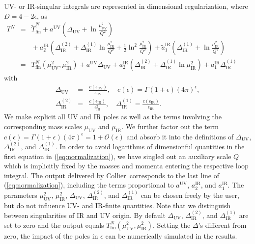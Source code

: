 \documentclass[preprint,sort&compress,12pt]{elsarticle}
\def\beqar{\begin{eqnarray}}
\def\eeqar{\end{eqnarray}}
\def\eps{\epsilon}
\def\refeq#1{\mbox{(\ref{#1})}}
\newcommand{\UV}{{\mathrm{UV}}}
\newcommand{\IR}{{\mathrm{IR}}}
\newcommand{\fin}{{\mathrm{fin}}}
\newcommand{\collier}{{\sc Collier}}
\def\nl{\nonumber\\}
\begin{document}
UV- or IR-singular integrals are represented in dimensional
regularization, where $D=4-2\eps$, as
\beqar
\label{eq:normalization}
T^N&=&
\tilde{T}^N_{\fin}
+  a^{\UV} \left(\Delta_{\UV}+\ln\frac{\mu^2_\UV}{Q^2}\right)
\nl&&{}
+ a^{\IR}_2 \left(\Delta^{(2)}_{\IR}+\Delta^{(1)}_{\IR}\ln\frac{\mu^2_\IR}{Q^2}+\frac{1}{2}\ln^2\frac{\mu^2_\IR}{Q^2}\right)
+ \tilde{a}^{\IR}_1 \left(\Delta^{(1)}_{\IR}+\ln\frac{\mu^2_\IR}{Q^2}\right)
\hspace{2em}\nl
&=&
T^N_{\fin}(\mu^2_\UV,\mu^2_\IR)
+  a^{\UV} \Delta_{\UV}
+ a^{\IR}_2 \left(\Delta^{(2)}_{\IR}+\Delta^{(1)}_{\IR}\ln\mu^2_\IR\right)
+ a^{\IR}_1 \Delta^{(1)}_{\IR}
\hspace{2em}
\eeqar
with
\beqar
\Delta_{\UV} &=& \frac{c(\eps_\UV)}{\eps_{\UV}}, \quad c(\eps) = \Gamma(1+\eps)(4\pi)^\eps,
\label{eq:normalizationUV}
\nonumber\\
\Delta^{(2)}_{\IR} &=& \frac{c(\eps_\IR)}{\eps_{\IR}^2}, \quad
               \Delta^{(1)}_{\IR} = \frac{c(\eps_\IR)}{\eps_{\IR}}.
\label{eq:normalizationIR}
\eeqar
We make
explicit all UV and IR poles as well as the terms involving the
corresponding mass scales $\mu_\UV$ and $\mu_\IR$.
We further factor out the term
$c(\eps)=\Gamma(1+\eps)(4\pi)^\eps=1+\mathcal{O}(\eps)$ and absorb it
into the definitions of $\Delta_{\UV}$, $\Delta^{(2)}_{\IR}$, and
$\Delta^{(1)}_{\IR}$. 
In order to avoid logarithms of dimensionful quantities in the first equation in \refeq{eq:normalization}, 
we have singled out an auxiliary scale $Q$ which is implicitly fixed by the masses and momenta entering the respective loop integral.  
The output delivered by \collier\ 
corresponds to the last line of \refeq{eq:normalization}, including
the terms proportional to $a^{\UV}$, $a^{\IR}_2$, and $a_1^{\IR}$. The
parameters $\mu^2_\UV$, $\mu^2_\IR$,
$\Delta_{\UV}$, $\Delta^{(2)}_{\IR}$, and $\Delta^{(1)}_{\IR}$ can be
chosen freely by the user, 
but do not influence UV- and IR-finite quantities.
Note that we distinguish between singularities of IR
and UV origin. By default $\Delta_{\UV}$,
$\Delta^{(2)}_{\IR}$, and $\Delta^{(1)}_{\IR}$ are set to zero and
the output equals $T^N_{\fin}(\mu^2_\UV,\mu^2_\IR)$. Setting the
$\Delta$'s different from zero, the impact of the poles 
in $\epsilon$ can be numerically simulated in the results.
\end{document}
